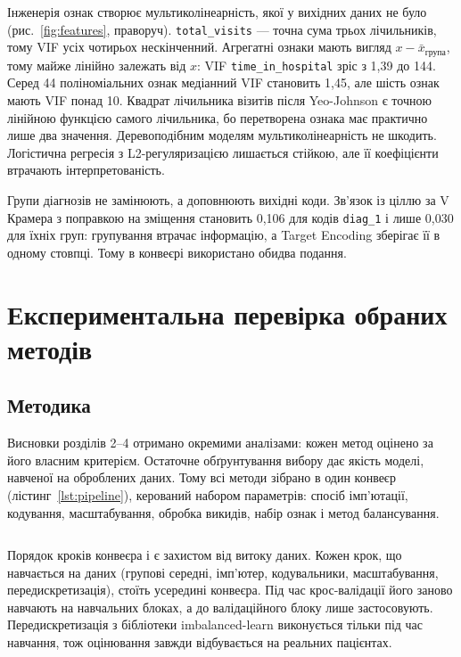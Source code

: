 \documentclass[14pt,a4paper]{extreport}
\begin{document}
Інженерія ознак створює мультиколінеарність, якої у вихідних даних не було (рис.~\ref{fig:features}, праворуч). \texttt{total\_visits} --- точна сума трьох лічильників, тому VIF усіх чотирьох нескінченний. Агрегатні ознаки мають вигляд $x - \bar{x}_{\text{група}}$, тому майже лінійно залежать від $x$: VIF \texttt{time\_in\_hospital} зріс з 1,39 до 144. Серед 44 поліноміальних ознак медіанний VIF становить 1,45, але шість ознак мають VIF понад 10. Квадрат лічильника візитів після Yeo-Johnson є точною лінійною функцією самого лічильника, бо перетворена ознака має практично лише два значення. Деревоподібним моделям мультиколінеарність не шкодить. Логістична регресія з L2-регуляризацією лишається стійкою, але її коефіцієнти втрачають інтерпретованість.

Групи діагнозів не замінюють, а доповнюють вихідні коди. Зв'язок із ціллю за V Крамера з поправкою на зміщення становить 0,106 для кодів \texttt{diag\_1} і лише 0,030 для їхніх груп: групування втрачає інформацію, а Target Encoding зберігає її в одному стовпці. Тому в конвеєрі використано обидва подання.

\section{Експериментальна перевірка обраних методів}
\label{sec:experiments}

\subsection{Методика}

Висновки розділів 2--4 отримано окремими аналізами: кожен метод оцінено за його власним критерієм. Остаточне обґрунтування вибору дає якість моделі, навченої на оброблених даних. Тому всі методи зібрано в один конвеєр (лістинг~\ref{lst:pipeline}), керований набором параметрів: спосіб імп'ютації, кодування, масштабування, обробка викидів, набір ознак і метод балансування.

\inputminted[firstline=118,lastline=163]{python}{../src/mk1/pipeline.py}
\label{lst:pipeline}

Порядок кроків конвеєра і є захистом від витоку даних. Кожен крок, що навчається на даних (групові середні, імп'ютер, кодувальники, масштабування, передискретизація), стоїть усередині конвеєра. Під час крос-валідації його заново навчають на навчальних блоках, а до валідаційного блоку лише застосовують. Передискретизація з бібліотеки imbalanced-learn виконується тільки під час навчання, тож оцінювання завжди відбувається на реальних пацієнтах.
\end{document}
